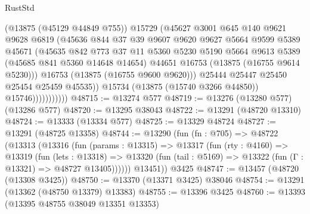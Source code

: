 \begin{lexlean}{RustStd}
\begin{coremodule}
                            (@13875 (@45129 @44849 @755))
                            @15729
                            (@45627
                              @3001
                              @645
                              @140
                              @9621
                              @9628
                              @6819
                              (@45636
                                @844
                                @37
                                @39
                                @9607
                                @9620
                                @9627
                                @5664
                                @9599
                                @5389
                                @45671
                                (@45635
                                  @842
                                  @773
                                  @37
                                  @11
                                  @5360
                                  @5230
                                  @5190
                                  @5664
                                  @9613
                                  @5389
                                  (@45685 @841 @5360 @14648 @14654)
                                  @44651
                                  @16753
                                  (@13875 (@16755 @9614 @5230)))
                                @16753
                                (@13875 (@16755 @9600 @9620)))
                              @25444
                              @25447
                              @25450
                              @25454
                              @25459
                              @45535))
                          @15734
                          (@13875 (@15740 @3266 @44850))
                          @15746)))))))))))
@48715 := @13274 @577
@48719 := @13276 (@13280 @577) (@13286 @577)
@48720 := @13295 @38043
@48722 := @13291 (@48720 @13310)
@48724 := @13333 (@13334 @577)
@48725 := @13329 @48724
@48727 := @13291 (@48725 @13358)
@48744 := @13290
    (fun (fn : @705) =>
    @48722
      (@13313
        (@13316
          (fun (params : @13315) =>
          @13317
            (fun (rty : @4160) =>
            @13319
              (fun (lets : @13318) =>
              @13320 (fun (tail : @5169) => @13322 (fun (Γ : @13321) => @48727 @13405))))))
        @13451))
    @3425
@48747 := @13457 (@48720 (@13308 @3425))
@48750 := @13370 (@13371 @3425) @38046
@48754 := @13291 (@13362 (@48750 @13379) @13383)
@48755 := @13396 @3425
@48760 := @13393 (@13395 @48755 @38049 @13351 @13353)

\end{coremodule}
\end{lexlean}
